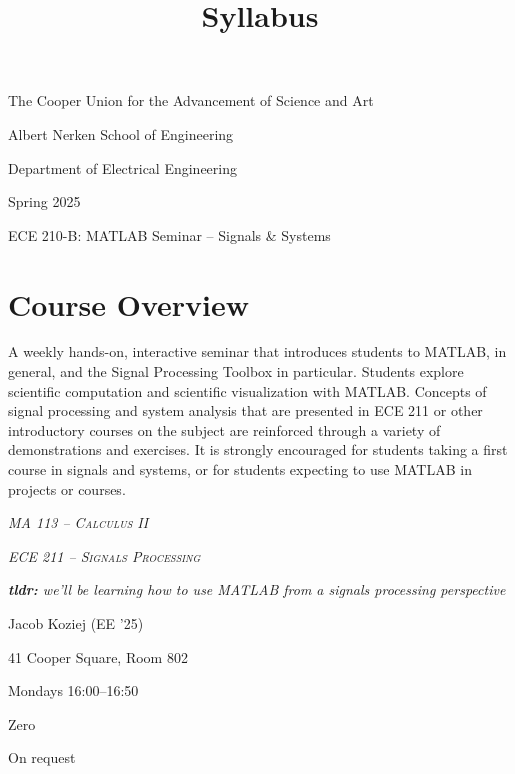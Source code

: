 \documentclass{article}
\title{Syllabus}
\begin{document}
\renderTitle

\scshape
\slshape

\begin{Centering}
The Cooper Union for the Advancement of Science and Art

Albert Nerken School of Engineering

Department of Electrical Engineering

Spring 2025

\leavevmode
\newline

ECE 210-B: MATLAB Seminar -- Signals \& Systems

\end{Centering}

\normalfont

\section{Course Overview}


\begin{displayquote}
	A weekly hands-on, interactive seminar that introduces students
	to MATLAB, in general, and the Signal Processing Toolbox in
	particular.  Students explore scientific computation and
	scientific visualization with MATLAB.  Concepts of signal
	processing and system analysis that are presented in ECE 211 or
	other introductory courses on the subject are reinforced through
	a variety of demonstrations and exercises.  It is strongly
	encouraged for students taking a first course in signals and
	systems, or for students expecting to use MATLAB in projects or
	courses.

	\footnotesize

	 \textsc{\textsl{MA 113 -- Calculus II}}

	 \textsc{\textsl{ECE 211 -- Signals
	Processing}}

	\textsl{\textbf{tldr:} we'll be learning how to use MATLAB from
	a signals processing perspective}
\end{displayquote}

 Jacob Koziej (EE '25)

 41 Cooper Square, Room 802

 Mondays 16:00--16:50

 Zero

 On request
\end{document}
